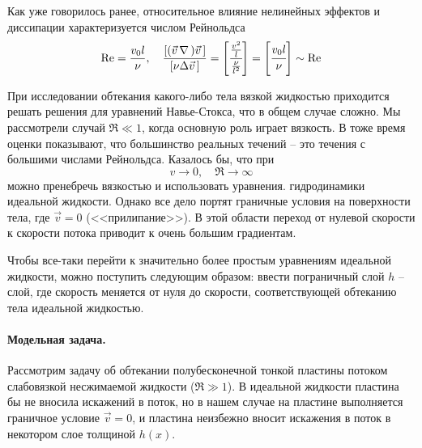  Как уже говорилось ранее, относительное влияние нелинейных эффектов и диссипации характеризуется числом Рейнольдса
\begin{equation}
    \Re = \frac{v_0 l}{\nu}, \quad \frac{[(\vec{v}\, \nabla\,)\vec{v}\,]}{[\nu \Delta \vec{v}\,]}= 
    \qty[
    	\cfrac{\frac{v^2}{l}}{\frac{\nu}{l^2}}
    	]=\qty[\cfrac{v_0 l}{\nu}] \sim \Re
\end{equation}

При исследовании обтекания какого-либо тела вязкой жидкостью приходится решать решения для уравнений Навье-Стокса, что в общем случае сложно.
Мы рассмотрели случай  $\Re \ll 1$, когда основную роль играет вязкость. В тоже время оценки показывают, что большинство реальных течений -- это течения с большими числами Рейнольдса. Казалось бы, что при   
\begin{equation}
 	v \to 0, \quad \Re \to \infty
 \end{equation} 
можно пренебречь вязкостью и использовать уравнения. гидродинамики идеальной жидкости. Однако все дело портят граничные условия на поверхности тела, где $\vec{v}=0$ (<<прилипание>>). В этой области переход от нулевой скорости к скорости потока приводит к очень большим градиентам. 

Чтобы все-таки перейти к значительно более простым уравнениям идеальной жидкости, можно поступить следующим образом: ввести пограничный слой $h$ -- слой, где скорость меняется от нуля до скорости, соответствующей обтеканию тела идеальной жидкостью\footnotemark.

\paragraph{Модельная задача.} Рассмотрим задачу об обтекании полубесконечной тонкой пластины потоком слабовязкой несжимаемой жидкости ($\Re \gg 1$). В идеальной жидкости пластина бы не вносила искажений в поток, но в нашем случае на пластине выполняется граничное условие $\vec{v}=0$, и    пластина неизбежно вносит искажения в поток в некотором слое толщиной $h(x)$. 

